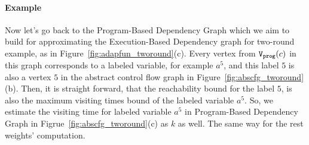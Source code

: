 \paragraph*{Example}
Now let's 
go back to the Program-Based Dependency Graph which we aim to build for approximating the 
Execution-Based Dependency graph for two-round example, as in
Figure~\ref{fig:adapfun_tworound}(c).
%
Every vertex from $\mathtt{{V_{prog}}}(c)$ in this graph corresponds to a labeled variable, for example $a^5$,
and this label $5$ is also a vertex $5$ in the abstract control flow graph in Figure~\ref{fig:abscfg_tworound}(b).
%
Then, it is straight forward, 
that the reachability bound for the label $5$, 
is also the maximum visiting times bound of the labeled variable $a^5$.
So, we estimate the visiting time for  labeled variable $a^5$ in Program-Based Dependency Graph in Figrue~\ref{fig:abscfg_tworound}(c) as $k$ as well.
%
The same way for the rest weights' computation.
%